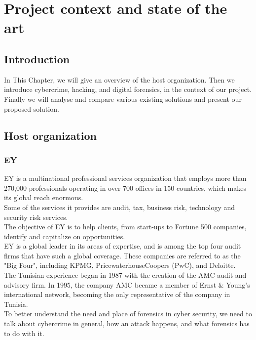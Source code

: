 
\renewcommand\thechapter{\Roman{chapter}}
\chapter{Project context and state of the art}


\newpage
{}
\section*{Introduction}
In This Chapter, we will give an overview of the host organization. Then we introduce cybercrime, hacking, and digital forensics, in the context of our project. Finally we will analyse and compare various existing solutions and present our proposed solution.

\section{Host organization}
\subsection{EY}
EY\cite{ey} is a multinational professional services organization that employs more than 270,000 professionals operating in over 700 offices in 150 countries, which makes its global reach enormous.\\
Some of the services it provides are audit, tax, business risk, technology and security risk services.\\
The objective of EY is to help clients, from start-ups to Fortune 500 companies, identify and capitalize on opportunities.\\
EY is a global leader in its areas of expertise, and is among the top four audit firms that have such a global coverage. These companies are referred to as the "Big Four", including KPMG, PricewaterhouseCoopers (PwC), and Deloitte.\\
The Tunisian experience began in 1987 with the creation of the AMC audit and advisory firm. In 1995, the company AMC became a member of Ernst \& Young's international network, becoming the only representative of the company in Tunisia.\\
To better understand the need and place of forensics in cyber security, we need to talk about cybercrime in general, how an attack happens, and what forensics has to do with it.
